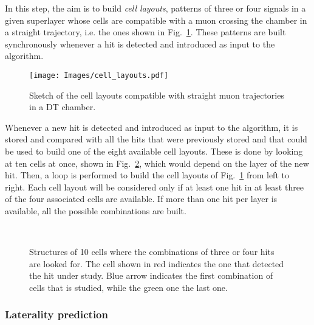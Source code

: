 \documentclass[../main.tex]{subfiles}
\begin{document}
In this step, the aim is to build \textit{cell layouts}, patterns of three or four signals in a given superlayer whose cells are compatible with a muon crossing the chamber in a straight trajectory, i.e. the ones shown in Fig.~\ref{dts:fig:cell_layouts}. These patterns are built synchronously whenever a hit is detected and introduced as input to the algorithm.

\begin{figure}[h!]
\begin{center}
\texttt{[image: Images/cell\_layouts.pdf]}
\end{center}
\caption{Sketch of the cell layouts compatible with straight muon trajectories in a DT chamber.}
\label{dts:fig:cell_layouts}
\end{figure}

Whenever a new hit is detected and introduced as input to the algorithm, it is stored and compared with all the hits that were previously stored and that could be used to build one of the eight available cell layouts. These is done by looking at ten cells at once, shown in Fig.~\ref{dts:fig:triangle}, which would depend on the layer of the new hit. Then, a loop is performed to build the cell layouts of Fig.~\ref{dts:fig:cell_layouts} from left to right. Each cell layout will be considered only if at least one hit in at least three of the four associated cells are available. If more than one hit per layer is available, all the possible combinations are built.

\begin{figure}[h!]
\begin{center}
\\
\end{center}
\caption{Structures of 10 cells where the combinations of three or four hits are looked for. The cell shown in red indicates the one that detected the hit under study. Blue arrow indicates the first combination of cells that is studied, while the green one the last one.}
\label{dts:fig:triangle}
\end{figure}

\subsubsection*{Laterality prediction}
\end{document}
